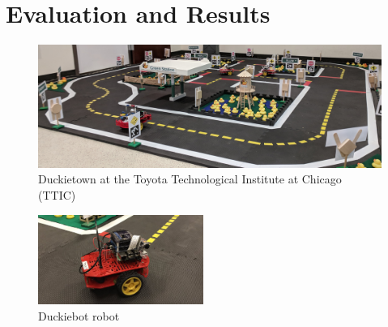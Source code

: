 \section{Evaluation and Results}

\begin{figure}[t]
    \centering
    \includegraphics[width=\textwidth]{figures/duckietown.jpg}
    \vspace{-12pt}
    \caption{Duckietown at the Toyota Technological Institute at Chicago (TTIC) \label{fig:duckietown}}
\end{figure}

\begin{figure}[t]
    \centering
    \includegraphics[width=0.48\textwidth]{figures/duckiebot.jpg}    
    \caption{Duckiebot robot \label{fig:duckiebot}}
\end{figure}

